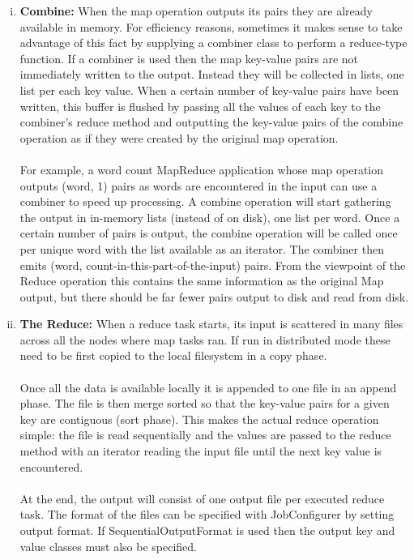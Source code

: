 \documentclass[a4paper,12pt,oneside]{report}
\begin{document}
\begin{enumerate}[(i)]
        \item \textbf{Combine:} When the map operation outputs its pairs they are already available in memory. For efficiency reasons, sometimes it makes sense to take advantage of this fact by supplying a combiner class to perform a reduce-type function. If a combiner is used then the map key-value pairs are not immediately written to the output. Instead they will be collected in lists, one list per each key value. When a certain number of key-value pairs have been written, this buffer is flushed by passing all the values of each key to the combiner's reduce method and outputting the key-value pairs of the combine operation as if they were created by the original map operation.\\ 
                \\
                For example, a word count MapReduce application whose map operation outputs (word, 1) pairs as words are encountered in the input can use a combiner to speed up processing. A combine operation will start gathering the output in in-memory lists (instead of on disk), one list per word. Once a certain number of pairs is output, the combine operation will be called once per unique word with the list available as an iterator. The combiner then emits (word, count-in-this-part-of-the-input) pairs. From the viewpoint of the Reduce operation this contains the same information as the original Map output, but there should be far fewer pairs output to disk and read from disk. 

        \item \textbf{The Reduce:}
                When a reduce task starts, its input is scattered in many files across all the nodes where map tasks ran. If run in distributed mode these need to be first copied to the local filesystem in a copy phase.\\ 
                \\
                Once all the data is available locally it is appended to one file in an append phase. The file is then merge sorted so that the key-value pairs for a given key are contiguous (sort phase). This makes the actual reduce operation simple: the file is read sequentially and the values are passed to the reduce method with an iterator reading the input file until the next key value is encountered.\\
                \\
                At the end, the output will consist of one output file per executed reduce task. The format of the files can be specified with JobConfigurer by setting output format. If SequentialOutputFormat is used then the output key and value classes must also be specified. 

\end{enumerate}
\end{document}
